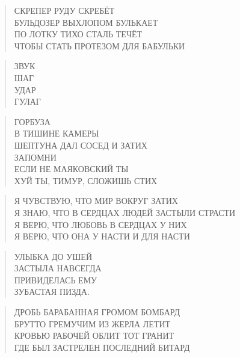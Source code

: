 \poemtitle{***}
\begin{verse}
СКРЕПЕР РУДУ СКРЕБЁТ\\
БУЛЬДОЗЕР ВЫХЛОПОМ БУЛЬКАЕТ\\
ПО ЛОТКУ ТИХО СТАЛЬ ТЕЧЁТ\\
ЧТОБЫ СТАТЬ ПРОТЕЗОМ ДЛЯ БАБУЛЬКИ
\end{verse}

\poemtitle{***}
\begin{verse}
ЗВУК\\
ШАГ\\
УДАР\\
ГУЛАГ
\end{verse}

\poemtitle{***}
\begin{verse}
ГОРБУЗА\\
В ТИШИНЕ КАМЕРЫ\\
ШЕПТУНА ДАЛ СОСЕД И ЗАТИХ\\
ЗАПОМНИ\\
    ЕСЛИ НЕ МАЯКОВСКИЙ ТЫ\\
        ХУЙ ТЫ, ТИМУР, СЛОЖИШЬ СТИХ
\end{verse}

\poemtitle{***}
\begin{verse}
Я ЧУВСТВУЮ, ЧТО МИР ВОКРУГ ЗАТИХ\\
Я ЗНАЮ, ЧТО В СЕРДЦАХ ЛЮДЕЙ ЗАСТЫЛИ СТРАСТИ\\
Я ВЕРЮ, ЧТО ЛЮБОВЬ В СЕРДЦАХ У НИХ\\
Я ВЕРЮ, ЧТО ОНА У НАСТИ И ДЛЯ НАСТИ
\end{verse}

\poemtitle{***}
\begin{verse}
УЛЫБКА ДО УШЕЙ\\
ЗАСТЫЛА НАВСЕГДА\\
ПРИВИДЕЛАСЬ ЕМУ\\
ЗУБАСТАЯ ПИЗДА.
\end{verse}

\poemtitle{***}
\begin{verse}
ДРОБЬ БАРАБАННАЯ ГРОМОМ БОМБАРД\\
БРУТТО ГРЕМУЧИМ ИЗ ЖЕРЛА ЛЕТИТ\\
КРОВЬЮ РАБОЧЕЙ ОБЛИТ ТОТ ГРАНИТ\\
ГДЕ БЫЛ ЗАСТРЕЛЕН ПОСЛЕДНИЙ БИТАРД
\end{verse}

